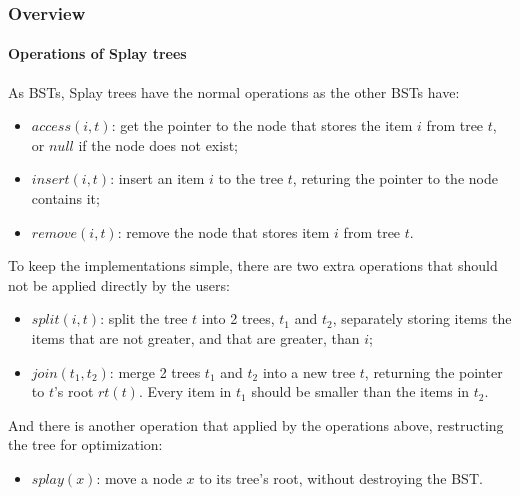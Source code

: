 \documentclass{beamer}
\theoremstyle{plain}
\begin{document}
    \begin{frame}
        \frametitle{Overview}
        \framesubtitle{Operations of Splay trees}
    
        As BSTs, Splay trees have the normal operations as the other BSTs have:\pause

        \begin{itemize}
            \item $access(i, t)$: get the pointer to the node that stores the item $i$ from tree $t$, or $null$ if the node does not exist; \pause
            \item $insert(i, t)$: insert an item $i$ to the tree $t$, returing the pointer to the node contains it; \pause
            \item $remove(i, t)$: remove the node that stores item $i$ from tree $t$.
        \end{itemize}
    
    \end{frame}

    \begin{frame}
    
        To keep the implementations simple, there are two extra operations that should not be applied directly by the users: \pause

        \begin{itemize}
            \item $split(i, t)$: split the tree $t$ into 2 trees, $t_1$ and $t_2$, separately storing items the items that are not greater, and that are greater, than $i$; \pause
            \item $join(t_1, t_2)$: merge 2 trees $t_1$ and $t_2$ into a new tree $t$, returning the pointer to $t$'s root $rt(t)$. Every item in $t_1$ should be smaller than the items in $t_2$. \pause
        \end{itemize}

        And there is another operation that applied by the operations above, restructing the tree for optimization: \pause

        \begin{itemize}
            \item $splay(x)$: move a node $x$ to its tree's root, without destroying the BST.
        \end{itemize}
    
    \end{frame}
\end{document}

